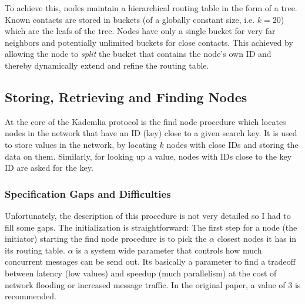 \documentclass[a4paper,10pt,notitlepage]{article}
\begin{document}
To achieve this, nodes maintain a hierarchical routing table in the form of a tree. 
Known contacts are stored in buckets (of a globally constant size, i.e. $k=20$) which are the leafs of the tree.
Nodes have only a single bucket for very far neighbors and potentially unlimited buckets for close contacts.
This achieved by allowing the node to \emph{split} the bucket that contains the node's own ID and thereby dynamically extend and refine the routing table.

\subsection{Storing, Retrieving and Finding Nodes}
At the core of the Kademlia protocol is the find node procedure which locates nodes in the network that have an ID (key) close to a given search key.
It is used to store values in the network, by locating $k$ nodes with close IDs and storing the data on them.
Similarly, for looking up a value, nodes with IDs close to the key ID are asked for the key.

\subsubsection{Specification Gaps and Difficulties}
Unfortunately, the description of this procedure is not very detailed so I had to fill some gaps.
The initialization is straightforward: The first step for a node (the initiator) starting the find node procedure is to pick the $\alpha$ closest nodes it has in its routing table.
$\alpha$ is a system wide parameter that controls how much concurrent messages can be send out.
Its basically a parameter to find a tradeoff between latency (low values) and speedup (much parallelism) at the cost of network flooding or increased message traffic.
In the original paper, a value of $3$ is recommended.
\end{document}
